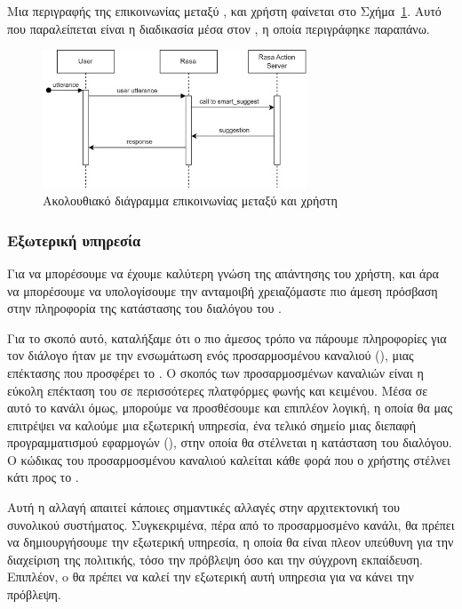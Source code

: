 Μια περιγραφής της επικοινωνίας μεταξύ ,  και χρήστη φαίνεται στο Σχήμα~\ref{fig:rasa_sequence}. Αυτό που παραλείπεται είναι η διαδικασία μέσα στον , η οποία περιγράφηκε παραπάνω.

\begin{figure}
    \centering
    \includegraphics[width=0.7\textwidth]{body_matter/our_work/images/Rasa_ActionServer.png}
    \caption{Ακολουθιακό διάγραμμα επικοινωνίας μεταξύ  και χρήστη}
    \label{fig:rasa_sequence}
\end{figure}

\subsubsection{Εξωτερική υπηρεσία}

Για να μπορέσουμε να έχουμε καλύτερη γνώση της απάντησης του χρήστη, και άρα να μπορέσουμε να υπολογίσουμε την ανταμοιβή χρειαζόμαστε πιο άμεση πρόσβαση στην πληροφορία της κατάστασης του διαλόγου του .

Για το σκοπό αυτό, καταλήξαμε ότι ο πιο άμεσος τρόπο να πάρουμε πληροφορίες για τον διάλογο ήταν με την ενσωμάτωση ενός προσαρμοσμένου καναλιού (), μιας επέκτασης που προσφέρει το . Ο σκοπός των προσαρμοσμένων καναλιών είναι η εύκολη επέκταση του  σε περισσότερες πλατφόρμες φωνής και κειμένου. Μέσα σε αυτό το κανάλι όμως, μπορούμε να προσθέσουμε και επιπλέον λογική, η οποία θα μας επιτρέψει να καλούμε μια εξωτερική υπηρεσία, ένα τελικό σημείο μιας διεπαφή προγραμματισμού εφαρμογών  (), στην οποία θα στέλνεται η κατάσταση του διαλόγου. Ο κώδικας του προσαρμοσμένου καναλιού καλείται κάθε φορά που ο χρήστης στέλνει κάτι προς το .

Αυτή η αλλαγή απαιτεί κάποιες σημαντικές αλλαγές στην αρχιτεκτονική του συνολικού συστήματος. Συγκεκριμένα, πέρα από το προσαρμοσμένο κανάλι, θα πρέπει να δημιουργήσουμε την εξωτερική υπηρεσία, η οποία θα είναι πλεον υπεύθυνη για την διαχείριση της πολιτικής, τόσο την πρόβλεψη όσο και την σύγχρονη εκπαίδευση. Επιπλέον, o  θα πρέπει να καλεί την εξωτερική αυτή υπηρεσια για να κάνει την πρόβλεψη.

